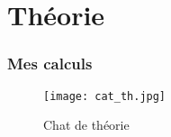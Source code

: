 \documentclass[../main.tex]{subfiles}
\begin{document}
\ifSubfilesClassLoaded{
}{}
\chapter{Théorie}
\subsection{Mes calculs}
\begin{figure}[h]
   \centering
    \texttt{[image: cat\_th.jpg]}
   \caption{Chat de théorie}
   \label{fig:chat_theorie}
\end{figure}
\ifSubfilesClassLoaded{%
    \printbibliography%
}{}
\end{document}
